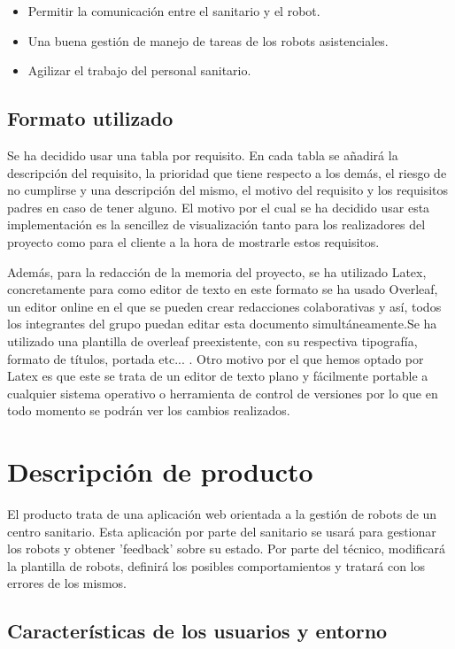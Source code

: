 \documentclass{scrreprt}
\begin{document}
\begin{itemize}
    \item Permitir la comunicación entre el sanitario y el robot. 
    \item Una buena gestión de manejo de tareas de los robots asistenciales.
    \item Agilizar el trabajo del personal sanitario. 
\end{itemize}

\section{Formato utilizado}

Se ha decidido usar una tabla por requisito. En cada tabla se añadirá la descripción del requisito, la prioridad que tiene respecto a los demás, el riesgo de no cumplirse y una descripción del mismo, el motivo del requisito y los requisitos padres en caso de tener alguno. El motivo por el cual se ha decidido usar esta implementación es la sencillez de visualización tanto para los realizadores del proyecto como para el cliente a la hora de mostrarle estos requisitos. 

Además, para la redacción de la memoria del proyecto, se ha utilizado Latex, concretamente para como editor de texto en este formato se ha usado Overleaf, un editor online en el que se pueden crear redacciones colaborativas y así, todos los integrantes del grupo puedan editar esta documento simultáneamente.Se ha utilizado una plantilla de overleaf preexistente, con su respectiva tipografía, formato de títulos, portada etc... . Otro motivo por el que hemos optado por Latex es que este se trata de un editor de texto plano y fácilmente portable a cualquier sistema operativo o herramienta de control de versiones por lo que en todo momento se podrán ver los cambios realizados.

\chapter{Descripción de producto}
El producto trata de una aplicación web orientada a la gestión de robots de un centro sanitario. Esta aplicación por parte del sanitario se usará para gestionar los robots y obtener 'feedback' sobre su estado. Por parte del técnico, modificará la plantilla de robots, definirá los posibles comportamientos y tratará con los errores de los mismos.

\section{Características de los usuarios y entorno }
\end{document}
